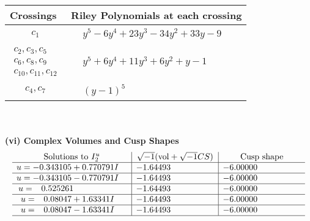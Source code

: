 \documentclass[1p]{elsarticle_modified}
\theoremstyle{definition}
\newcommand{\I}{\sqrt{-1}}
\begin{document}
\begin{tabular}{m{50pt}|m{274pt}}
Crossings & \hspace{64pt}Riley Polynomials at each crossing \\
\hline $$\begin{aligned}c_{1}\end{aligned}$$&$\begin{aligned}
&y^5-6 y^4+23 y^3-34 y^2+33 y-9
\end{aligned}$\\
\hline $$\begin{aligned}c_{2},c_{3},c_{5}\\c_{6},c_{8},c_{9}\\c_{10},c_{11},c_{12}\end{aligned}$$&$\begin{aligned}
&y^5+6 y^4+11 y^3+6 y^2+y-1
\end{aligned}$\\
\hline $$\begin{aligned}c_{4},c_{7}\end{aligned}$$&$\begin{aligned}
&(y-1)^5
\end{aligned}$\\
\hline
\end{tabular}\\~\\
\newpage\flushleft \textbf{(vi) Complex Volumes and Cusp Shapes}
$$\begin{array}{c|c|c}  
\text{Solutions to }I^u_{2}& \I (\text{vol} + \sqrt{-1}CS) & \text{Cusp shape}\\
 \hline 
\begin{aligned}
u &= -0.343105 + 0.770791 I\end{aligned}
 & -1.64493\phantom{ +0.000000I} & -6.00000\phantom{ +0.000000I} \\ \hline\begin{aligned}
u &= -0.343105 - 0.770791 I\end{aligned}
 & -1.64493\phantom{ +0.000000I} & -6.00000\phantom{ +0.000000I} \\ \hline\begin{aligned}
u &= \phantom{-}0.525261\phantom{ +0.000000I}\end{aligned}
 & -1.64493\phantom{ +0.000000I} & -6.00000\phantom{ +0.000000I} \\ \hline\begin{aligned}
u &= \phantom{-}0.08047 + 1.63341 I\end{aligned}
 & -1.64493\phantom{ +0.000000I} & -6.00000\phantom{ +0.000000I} \\ \hline\begin{aligned}
u &= \phantom{-}0.08047 - 1.63341 I\end{aligned}
 & -1.64493\phantom{ +0.000000I} & -6.00000\phantom{ +0.000000I}\\
 \hline 
 \end{array}$$\newpage
\end{document}
